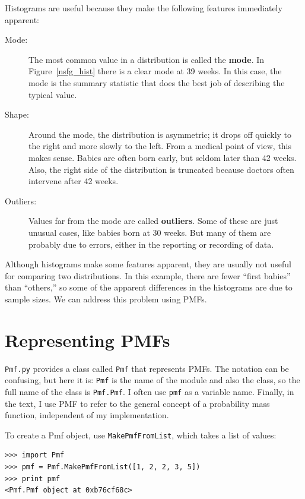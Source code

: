 \documentclass[12pt]{book}
\begin{document}
Histograms are useful because they make the following features immediately
apparent:

\begin{description}

\item[Mode:] The most common value in a distribution is called the
  {\bf mode}.  In Figure~\ref{nsfg_hist} there is a clear mode at 39
  weeks.  In this case, the mode is the summary statistic that does
  the best job of describing the typical value.

\item[Shape:] Around the mode, the distribution is asymmetric; it
  drops off quickly to the right and more slowly to the left.  From a
  medical point of view, this makes sense.  Babies are often born
  early, but seldom later than 42 weeks.  Also, the right side of the
  distribution is truncated because doctors often intervene after 42
  weeks.

\item[Outliers:] Values far from the mode are called {\bf outliers}.
  Some of these are just unusual cases, like babies born at 30 weeks.
  But many of them are probably due to errors, either in the reporting
  or recording of data.

\end{description}

Although histograms make some features apparent, they are usually not
useful for comparing two distributions.  In this example, there are
fewer ``first babies'' than ``others,'' so some of the apparent
differences in the histograms are due to sample sizes.  We can
address this problem using PMFs.


\section{Representing PMFs}

{\tt Pmf.py} provides a class called {\tt Pmf} that represents PMFs.
The notation can be confusing, but here it is: {\tt Pmf} is the
name of the module and also the class, so the full name of the class
is {\tt Pmf.Pmf}.  I often use {\tt pmf} as a variable name.
Finally, in the text, I use PMF to refer to the general concept
of a probability mass function, independent of my implementation.

To create a Pmf object, use {\tt MakePmfFromList}, which takes a list
of values:
%
\begin{verbatim}
>>> import Pmf
>>> pmf = Pmf.MakePmfFromList([1, 2, 2, 3, 5])
>>> print pmf
<Pmf.Pmf object at 0xb76cf68c>
\end{verbatim}
\end{document}
